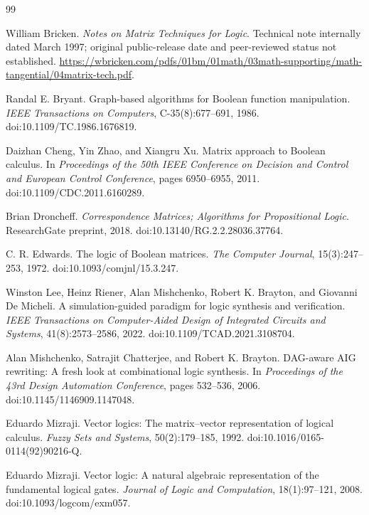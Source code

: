 \documentclass[10pt]{article}
\theoremstyle{plain}
\theoremstyle{definition}
\theoremstyle{remark}
\begin{document}
\begin{thebibliography}{99}

William Bricken.
\newblock \emph{Notes on Matrix Techniques for Logic}.
\newblock Technical note internally dated March 1997; original public-release date and peer-reviewed status not established.
\newblock \url{https://wbricken.com/pdfs/01bm/01math/03math-supporting/math-tangential/04matrix-tech.pdf}.

Randal E. Bryant.
\newblock Graph-based algorithms for Boolean function manipulation.
\newblock \emph{IEEE Transactions on Computers}, C-35(8):677--691, 1986.
\newblock doi:10.1109/TC.1986.1676819.

Daizhan Cheng, Yin Zhao, and Xiangru Xu.
\newblock Matrix approach to Boolean calculus.
\newblock In \emph{Proceedings of the 50th IEEE Conference on Decision and Control and European Control Conference}, pages 6950--6955, 2011.
\newblock doi:10.1109/CDC.2011.6160289.

Brian Droncheff.
\newblock \emph{Correspondence Matrices; Algorithms for Propositional Logic}.
\newblock ResearchGate preprint, 2018.
\newblock doi:10.13140/RG.2.2.28036.37764.

C. R. Edwards.
\newblock The logic of Boolean matrices.
\newblock \emph{The Computer Journal}, 15(3):247--253, 1972.
\newblock doi:10.1093/comjnl/15.3.247.

Winston Lee, Heinz Riener, Alan Mishchenko, Robert K. Brayton, and Giovanni De Micheli.
\newblock A simulation-guided paradigm for logic synthesis and verification.
\newblock \emph{IEEE Transactions on Computer-Aided Design of Integrated Circuits and Systems}, 41(8):2573--2586, 2022.
\newblock doi:10.1109/TCAD.2021.3108704.

Alan Mishchenko, Satrajit Chatterjee, and Robert K. Brayton.
\newblock DAG-aware AIG rewriting: A fresh look at combinational logic synthesis.
\newblock In \emph{Proceedings of the 43rd Design Automation Conference}, pages 532--536, 2006.
\newblock doi:10.1145/1146909.1147048.

Eduardo Mizraji.
\newblock Vector logics: The matrix--vector representation of logical calculus.
\newblock \emph{Fuzzy Sets and Systems}, 50(2):179--185, 1992.
\newblock doi:10.1016/0165-0114(92)90216-Q.

Eduardo Mizraji.
\newblock Vector logic: A natural algebraic representation of the fundamental logical gates.
\newblock \emph{Journal of Logic and Computation}, 18(1):97--121, 2008.
\newblock doi:10.1093/logcom/exm057.


\end{thebibliography}
\end{document}

